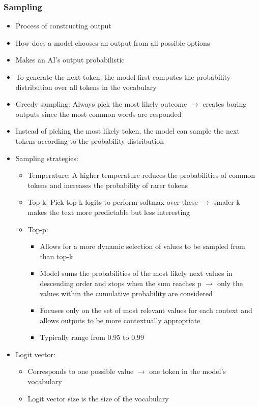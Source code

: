 \documentclass[11pt]{scrartcl}
\begin{document}
\subsubsection*{Sampling}
\begin{itemize}
	\item Process of constructing output
	\item How does a model chooses an output from all possible options
	\item Makes an AI's output probabilistic
	\item To generate the next token, the model first computes the probability distribution over all tokens in the vocabulary
	\item Greedy sampling: Always pick the most likely outcome $\to$ creates boring outputs since the most common words are responded
	\item Instead of picking the most likely token, the model can sample the next tokens according to the probability distribution
	\item Sampling strategies:
	\begin{itemize}
		\item Temperature: A higher temperature reduces the probabilities of common tokens and increases the probability of rarer tokens
		\item Top-k: Pick top-k logits to perform softmax over these $\to$ smaler k makes the text more predictable but less interesting
		\item Top-p: 
		\begin{itemize}
			\item Allows for a more dynamic selection of values to be sampled from than top-k
			\item Model sums the probabilities of the most likely next values in descending order and stops when the sum reaches p $\to$ only the values within the cumulative probability are considered
			\item Focuses only on the set of most relevant values for each context and allows outputs to be more contextually appropriate
			\item Typically range from 0.95 to 0.99
		\end{itemize}
	\end{itemize}
	\item Logit vector:
	\begin{itemize}
		\item Corresponds to one possible value $\to$ one token in the model's vocabulary
		\item Logit vector size is the size of the vocabulary

\end{itemize}
\end{itemize}
\end{document}
